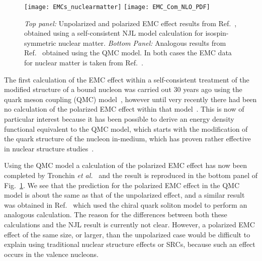 \begin{figure}[tbp]
\centering\texttt{[image: EMCs\_nuclearmatter]}
\centering\texttt{[image: EMC\_Com\_NLO\_PDF]}
\caption{{\it Top panel:} Unpolarized and polarized EMC effect results from Ref.~\cite{Cloet:2005rt}, obtained using a self-consistent NJL model calculation for isospin-symmetric nuclear matter. {\it Bottom Panel:} Analogous results from Ref.~\cite{Tronchin:2018mvu} obtained using the QMC model. In both cases the EMC data for nuclear matter is taken from Ref.~\cite{Sick:1992pw}.}
\label{fig:EMC_Com}
\end{figure}

The first calculation of the EMC effect within a self-consistent treatment of the modified structure of a bound nucleon was carried out 30 years ago using the quark meson coupling (QMC)  model~\cite{Thomas:1989vt}, however until very recently there had been no calculation of the polarized EMC effect within that model~\cite{Guichon:1995ue}. This is now of particular interest because it has been possible to derive an energy density functional equivalent to the QMC model, which starts with the modification of the quark structure of the nucleon in-medium, which has proven rather effective in nuclear structure studies~\cite{Guichon:2018uew,Stone:2017oqt,Stone:2016qmi}. 

Using the QMC model a calculation of the polarized EMC effect has now been completed by Tronchin {\it et al.}~\cite{Tronchin:2018mvu} and the result is reproduced in the bottom panel of Fig.~\ref{fig:EMC_Com}. We see that the prediction for the polarized EMC effect in the QMC model is about the same as that of the unpolarized effect, and a similar result was obtained in Ref.~\cite{Smith:2005ra} which used the chiral quark soliton model to perform an analogous calculation. The reason for the differences between both these calculations and the NJL result is currently not clear. However, a polarized EMC effect of the same size, or larger, than the unpolarized case would be difficult to explain using traditional nuclear structure effects or SRCs, because such an effect occurs in the valence nucleons. 

